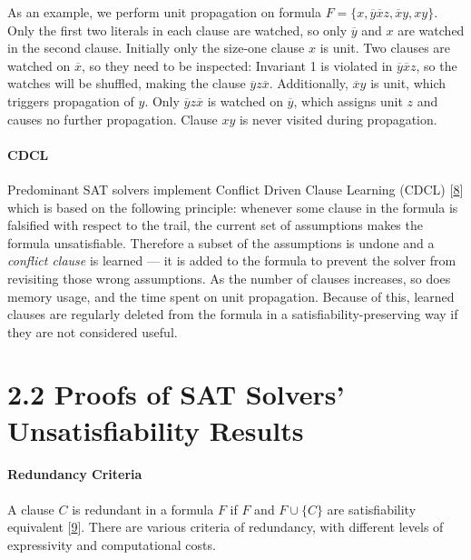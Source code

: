 \documentclass[
]{report}
\begin{document}
As an example, we perform unit propagation on formula
\(F = \{x, \overline{y}\overline{x}z, \overline{x}y, xy\}\). Only the
first two literals in each clause are watched, so only \(\overline{y}\)
and \(x\) are watched in the second clause. Initially only the size-one
clause \(x\) is unit. Two clauses are watched on \(\overline{x}\), so
they need to be inspected: Invariant 1 is violated in
\(\overline{y}\overline{x}z\), so the watches will be shuffled, making
the clause \(\overline{y}z\overline{x}\). Additionally,
\(\overline{x}y\) is unit, which triggers propagation of \(y\). Only
\(\overline{y}z\overline{x}\) is watched on \(\overline{y}\), which
assigns unit \(z\) and causes no further propagation. Clause \(xy\) is
never visited during propagation.

\paragraph{CDCL}

Predominant SAT solvers implement Conflict Driven Clause Learning (CDCL)
{[}\protect\hyperlink{ref-cdcl}{8}{]} which is based on the following
principle: whenever some clause in the formula is falsified with respect
to the trail, the current set of assumptions makes the formula
unsatisfiable. Therefore a subset of the assumptions is undone and a
\emph{conflict clause} is learned --- it is added to the formula to
prevent the solver from revisiting those wrong assumptions. As the
number of clauses increases, so does memory usage, and the time spent on
unit propagation. Because of this, learned clauses are regularly deleted
from the formula in a satisfiability-preserving way if they are not
considered useful.

\hypertarget{proofs-of-sat-solvers-unsatisfiability-results}{%
\section{2.2 Proofs of SAT Solvers' Unsatisfiability
Results}\label{proofs-of-sat-solvers-unsatisfiability-results}}

\paragraph{Redundancy Criteria}

A clause \(C\) is redundant in a formula \(F\) if \(F\) and
\(F \cup \{C\}\) are satisfiability equivalent
{[}\protect\hyperlink{ref-Heule_2017}{9}{]}. There are various criteria
of redundancy, with different levels of expressivity and computational
costs.
\end{document}
